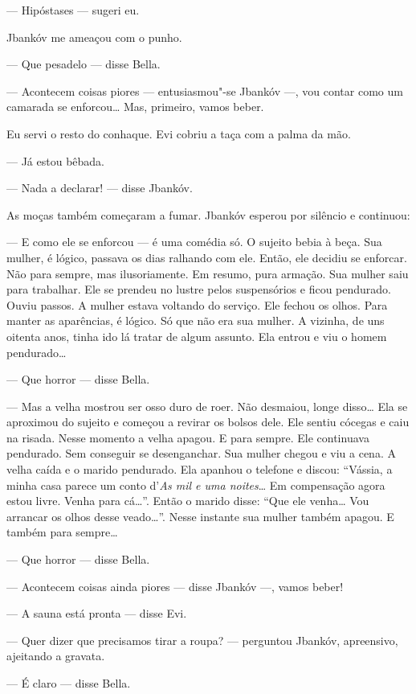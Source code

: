 --- Hipóstases --- sugeri eu.

Jbankóv me ameaçou com o punho.

--- Que pesadelo --- disse Bella.

--- Acontecem coisas piores --- entusiasmou"-se Jbankóv
---, vou contar como um camarada se enforcou\ldots{} Mas, primeiro,
vamos beber.

Eu servi o resto do conhaque. Evi cobriu a taça com a palma da mão.

--- Já estou bêbada.

--- Nada a declarar! --- disse Jbankóv.

As moças também começaram a fumar. Jbankóv esperou por silêncio e
continuou:

--- E como ele se enforcou --- é uma comédia só. O sujeito
bebia à beça. Sua mulher, é lógico, passava os dias ralhando com ele.
Então, ele decidiu se enforcar. Não para sempre, mas ilusoriamente. Em
resumo, pura armação. Sua mulher saiu para trabalhar. Ele se prendeu no
lustre pelos suspensórios e ficou pendurado. Ouviu passos. A mulher
estava voltando do serviço. Ele fechou os olhos. Para manter as
aparências, é lógico. Só que não era sua mulher. A vizinha, de uns
oitenta anos, tinha ido lá tratar de algum assunto. Ela entrou e viu o
homem pendurado\ldots{}

--- Que horror --- disse Bella.

--- Mas a velha mostrou ser osso duro de roer. Não desmaiou,
longe disso\ldots{} Ela se aproximou do sujeito e começou a revirar os bolsos
dele. Ele sentiu cócegas e caiu na risada. Nesse momento a velha apagou.
E para sempre. Ele continuava pendurado. Sem conseguir se desenganchar.
Sua mulher chegou e viu a cena. A velha caída e o marido pendurado. Ela
apanhou o telefone e discou: ``Vássia, a minha casa parece um conto
d'\emph{As mil e uma noites}\ldots{} Em compensação agora estou livre. Venha
para cá\ldots{}''. Então o marido disse: ``Que ele venha\ldots{} Vou arrancar os
olhos desse veado\ldots{}''. Nesse instante sua mulher também apagou. E
também para sempre\ldots{}

--- Que horror --- disse Bella.

--- Acontecem coisas ainda piores --- disse Jbankóv
---, vamos beber!

--- A sauna está pronta --- disse Evi.

--- Quer dizer que precisamos tirar a roupa? --- perguntou
Jbankóv, apreensivo, ajeitando a gravata.

--- É claro --- disse Bella.

